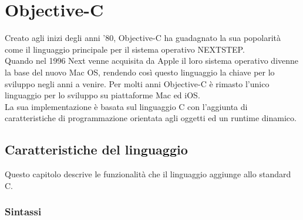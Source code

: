 \chapter{Objective-C}
Creato agli inizi degli anni '80, Objective-C ha guadagnato la sua popolarità come il linguaggio principale per il sistema operativo NEXTSTEP.\\
Quando nel 1996 Next venne acquisita da Apple il loro sistema operativo divenne la base del nuovo Mac OS, rendendo così questo linguaggio la chiave per lo sviluppo negli anni a venire. Per molti anni Objective-C è rimasto l’unico linguaggio per lo sviluppo su piattaforme Mac ed iOS.\\
La sua implementazione è basata sul linguaggio C con l'aggiunta di caratteristiche di programmazione orientata agli oggetti ed un runtime dinamico.
\section{Caratteristiche del linguaggio}
Questo capitolo descrive le funzionalità che il linguaggio aggiunge allo standard C. 
\subsection{Sintassi}
